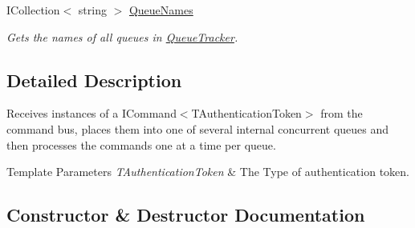 \begin{DoxyCompactItemize}
I\+Collection$<$ string $>$ \hyperlink{classCqrs_1_1Bus_1_1QueuedCommandBusReceiver_a959facef20063d615b427eafa4290e0f_a959facef20063d615b427eafa4290e0f}{Queue\+Names}
\begin{DoxyCompactList}\small\item\em Gets the names of all queues in \hyperlink{classCqrs_1_1Bus_1_1QueuedCommandBusReceiver_a2fc62989429929acd8ea66808a8c4a78_a2fc62989429929acd8ea66808a8c4a78}{Queue\+Tracker}. \end{DoxyCompactList}\end{DoxyCompactItemize}


\subsection{Detailed Description}
Receives instances of a I\+Command$<$\+T\+Authentication\+Token$>$ from the command bus, places them into one of several internal concurrent queues and then processes the commands one at a time per queue. 


\begin{DoxyTemplParams}{Template Parameters}
{\em T\+Authentication\+Token} & The Type of authentication token.\\
\hline
\end{DoxyTemplParams}


\subsection{Constructor \& Destructor Documentation}
\mbox{\label{classCqrs_1_1Bus_1_1QueuedCommandBusReceiver_aa5158357f8e2007f06b640d4a4129781_aa5158357f8e2007f06b640d4a4129781}} 
